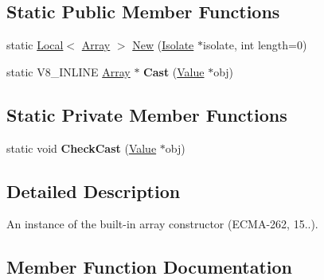 \subsection*{Static Public Member Functions}
\begin{DoxyCompactItemize}
\item 
static \hyperlink{classv8_1_1_local}{Local}$<$ \hyperlink{classv8_1_1_array}{Array} $>$ \hyperlink{classv8_1_1_array_a369cbd533bf7aa08d9ce1e2ddb4e6536}{New} (\hyperlink{classv8_1_1_isolate}{Isolate} $\ast$isolate, int length=0)
\item 
static V8\+\_\+\+I\+N\+L\+I\+NE \hyperlink{classv8_1_1_array}{Array} $\ast$ {\bfseries Cast} (\hyperlink{classv8_1_1_value}{Value} $\ast$obj)\hypertarget{classv8_1_1_array_ae56792766f8513395c3ebe8c29afde4b}{}\label{classv8_1_1_array_ae56792766f8513395c3ebe8c29afde4b}

\end{DoxyCompactItemize}
\subsection*{Static Private Member Functions}
\begin{DoxyCompactItemize}
\item 
static void {\bfseries Check\+Cast} (\hyperlink{classv8_1_1_value}{Value} $\ast$obj)\hypertarget{classv8_1_1_array_afb59e82fea34f878cb3d41599e97b5b2}{}\label{classv8_1_1_array_afb59e82fea34f878cb3d41599e97b5b2}

\end{DoxyCompactItemize}


\subsection{Detailed Description}
An instance of the built-\/in array constructor (E\+C\+M\+A-\/262, 15..). 

\subsection{Member Function Documentation}
